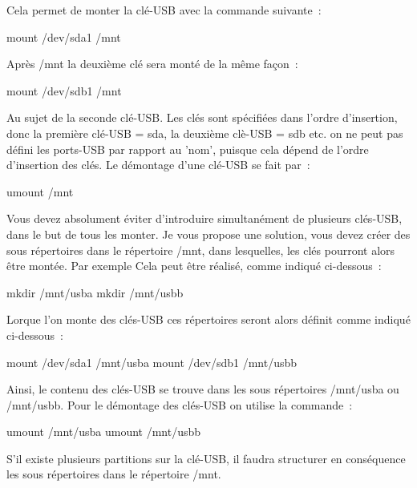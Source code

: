 Cela permet de monter la clé-USB avec la commande suivante~:

mount /dev/sda1 /mnt

Après /mnt la deuxième clé sera monté de la même façon~:

mount /dev/sdb1 /mnt

Au sujet de la seconde clé-USB. Les clés sont spécifiées dans l'ordre d'insertion,
donc la première clé-USB = sda, la deuxième clè-USB = sdb etc. on ne peut pas
défini les ports-USB par rapport au 'nom', puisque cela dépend de l'ordre
d'insertion des clés. Le démontage d'une clé-USB se fait par~:

umount /mnt

Vous devez absolument éviter d'introduire simultanément de plusieurs clés-USB,
dans le but de tous les monter. Je vous propose une solution, vous devez créer
des sous répertoires dans le répertoire /mnt, dans lesquelles, les clés pourront
alors être montée. Par exemple Cela peut être réalisé, comme indiqué ci-dessous~:

mkdir /mnt/usba
mkdir /mnt/usbb

Lorque l'on monte des clés-USB ces répertoires seront alors définit comme
indiqué ci-dessous~:

mount /dev/sda1 /mnt/usba
mount /dev/sdb1 /mnt/usbb

Ainsi, le contenu des clés-USB se trouve dans les sous répertoires /mnt/usba ou
/mnt/usbb. Pour le démontage des clés-USB on utilise la commande~:

umount /mnt/usba
umount /mnt/usbb

S'il existe plusieurs partitions sur la clé-USB, il faudra structurer en
conséquence les sous répertoires dans le répertoire /mnt.
